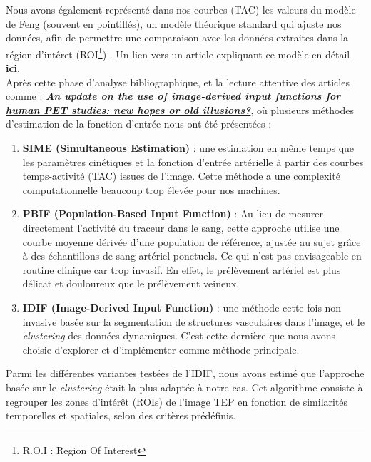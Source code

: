 \documentclass[a4paper]{article}
\begin{document}
            \noindent
            Nous avons également représenté dans nos courbes (TAC) les valeurs du modèle de Feng (souvent en pointillés), un modèle théorique standard qui ajuste nos données, afin de permettre une comparaison avec les données extraites dans la région d'intêret (ROI\footnote{R.O.I : Region Of Interest}) . Un lien vers un article expliquant ce modèle en détail \href{https://www.sciencedirect.com/science/article/abs/pii/002071019390049C?via\%3Dihub}{\textbf{ici}}.\\
            
            \noindent
            Après cette phase d'analyse bibliographique, et la lecture attentive des articles comme : \textbf{\textit{\href{https://pubmed.ncbi.nlm.nih.gov/37947880/}{An update on the use of image-derived input functions for human PET studies: new hopes or old illusions?}}}, où plusieurs méthodes d’estimation de la fonction d’entrée nous ont été présentées :

            \begin{enumerate}
                \item \textbf{SIME (Simultaneous Estimation)} : une estimation en même temps que les paramètres cinétiques et la fonction d'entrée artérielle à partir des courbes temps-activité (TAC) issues de l'image. Cette méthode a une complexité computationnelle beaucoup trop élevée pour nos machines.
                \item \textbf{PBIF (Population-Based Input Function)} : Au lieu de mesurer directement l'activité du traceur dans le sang, cette approche utilise une courbe moyenne dérivée d'une population de référence, ajustée au sujet grâce à des échantillons de sang artériel ponctuels. Ce qui n'est pas envisageable en routine clinique car trop invasif. En effet, le prélèvement artériel est plus délicat et douloureux que le prélèvement veineux.
                \item \textbf{IDIF (Image-Derived Input Function)} : une méthode cette fois non invasive basée sur la segmentation de structures vasculaires dans l’image, et le \textit{clustering} des données dynamiques. C’est cette dernière que nous avons choisie d’explorer et d’implémenter comme méthode principale.\\
            \end{enumerate}
            
            \noindent
            Parmi les différentes variantes testées de l’IDIF, nous avons estimé que l’approche basée sur le \textit{clustering} était la plus adaptée à notre cas. Cet algorithme consiste à regrouper les zones d’intérêt (ROIs) de l’image TEP en fonction de similarités temporelles et spatiales, selon des critères prédéfinis.\\
            
\end{document}
